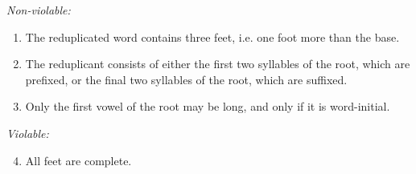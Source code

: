 \newpage 
\textit{Non-violable:}

\begin{enumerate}
\item 
The reduplicated word contains three feet, i.e. one foot more than the base.

\item 
The reduplicant consists of either the first two syllables of the root, which are prefixed, or the final two syllables of the root, which are suffixed.

\item 
Only the first vowel of the root may be long, and only if it is word-initial.

\end{enumerate}

\textit{Violable:}

\begin{enumerate}
\setcounter{enumi}{3}
\item 
All feet are complete.

\end{enumerate}

